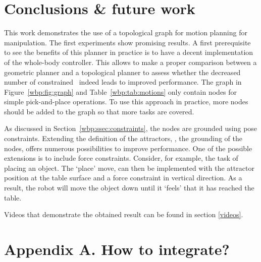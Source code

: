 \section{Conclusions \& future work}\label{wbp:sec:discussion}
This work demonstrates the use of a topological graph for motion planning for manipulation. The first experiments show promising results. A first prerequisite to see the benefits of this planner in practice is to have a decent implementation of the whole-body controller. This allows to make a proper comparison between a geometric planner and a topological planner to assess whether the decreased number of constrained \dofs\ indeed leads to improved performance.
The graph in Figure~\ref{wbp:fig:graph} and Table~\ref{wbp:tab:motions} only contain nodes for simple pick-and-place operations. 
To use this approach in practice, more nodes should be added to the graph so that more tasks are covered. 

As discussed in Section~\ref{wbp:ssec:constraints}, the nodes are grounded using pose constraints. 
Extending the definition of the attractors, \ie, the grounding of the nodes, offers numerous possibilities to improve performance. One of the possible extensions is to include force constraints.
Consider, for example, the task of placing an object. The `place' move, can then be implemented with the attractor position at the table surface and a force constraint in vertical direction. As a result, the robot will move the object down until it `feels' that it has reached the table. 

Videos that demonstrate the obtained result can be found in section \ref{videos}.

\newpage
\section{Appendix A. How to integrate?}
\label{ap:integration}

